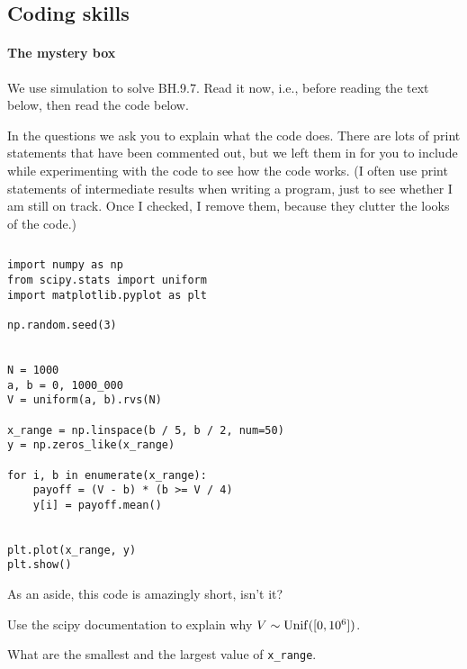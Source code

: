 \documentclass[assignments]{subfiles}
\begin{document}
\subsection{Coding skills}
\label{sec:coding-skills-1}

\paragraph{The mystery box}

We use  simulation to solve  BH.9.7.
Read it now, i.e., before reading the text below, then read the code below.


In the questions we ask you to explain what the code does.
There are lots of print statements that have been commented out, but we left them in for you to include while experimenting with the code to see how the code works.
(I often use print statements of intermediate results when writing a program, just to see whether I am still on track.
Once I checked, I remove them, because they clutter the looks of the code.)

\begin{verbatim}

\end{verbatim}


\begin{verbatim}
import numpy as np
from scipy.stats import uniform
import matplotlib.pyplot as plt

np.random.seed(3)


N = 1000
a, b = 0, 1000_000
V = uniform(a, b).rvs(N)

x_range = np.linspace(b / 5, b / 2, num=50)
y = np.zeros_like(x_range)

for i, b in enumerate(x_range):
    payoff = (V - b) * (b >= V / 4)
    y[i] = payoff.mean()


plt.plot(x_range, y)
plt.show()
\end{verbatim}

As an aside, this code is amazingly short, isn't it?

\begin{exercise}
Use the scipy documentation to explain why $V\sim\mathrm{Unif}([0,10^{6}])$.
\begin{solution}
\end{solution}
\end{exercise}



\begin{exercise}
What are the smallest and the largest value of \verb|x_range|.
\begin{solution}
\end{solution}
\end{exercise}
\end{document}

